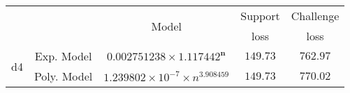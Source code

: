 \begin{tabular}{ccccc} 
\hline 
 &  & \multirow{2}{*}{Model} & Support & Challenge\tabularnewline 
 &  &  & loss  & loss\tabularnewline 
\hline 
\hline 
\multirow{2}{*}{d4} & Exp. Model & $\mathbf{0.002751238\times 1.117442^{n}}$ & $\mathbf{149.73}$ & $\mathbf{762.97}$ \tabularnewline 
 & Poly. Model & $1.239802\times10^{-7}\times n^{3.908459}$ & $149.73$ & $770.02$ \tabularnewline 
\hline 
\end{tabular} 

